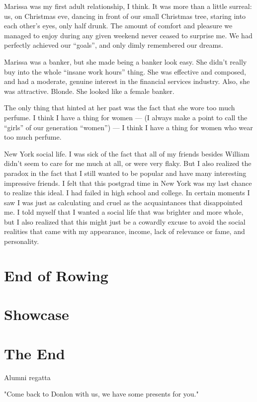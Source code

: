 \documentclass[12pt]{article}
\begin{document}
Marissa was my first adult relationship, I think.  It was more than a little
surreal: us, on Christmas eve, dancing in front of our small Christmas tree,
staring into each other's eyes, only half drunk.  The amount of comfort and
pleasure we managed to enjoy during any given weekend never ceased to surprise
me.  We had perfectly achieved our ``goals'', and only dimly remembered our
dreams.

Marissa was a banker, but she made being a banker look easy.  She didn't really
buy into the whole ``insane work hours'' thing.  She was effective and composed,
and had a moderate, genuine interest in the financial services industry.  Also,
she was attractive.  Blonde.  She looked like a female banker. 

The only thing that hinted at her past was the fact that she wore too much
perfume.  I think I have a thing for women --- (I always make a point to call
the ``girls'' of our generation ``women'') --- I think I have a thing for women
who wear too much perfume.

New York social life.  I was sick of the fact that all of my friends besides
William didn't seem to care for me much at all, or were very flaky.  But I also
realized the paradox in the fact that I still wanted to be popular and have many
interesting impressive friends.  I felt that this postgrad time in New York was
my last chance to realize this ideal.  I had failed in high school and college.
In certain moments I saw I was just as calculating and cruel as the
acquaintances that disappointed me.  I told myself that I wanted a social life
that was brighter and more whole, but I also realized that this might just be a
cowardly excuse to avoid the social realities that came with my appearance,
income, lack of relevance or fame, and personality.


\section{End of Rowing}

\section{Showcase}

\section{The End}
Alumni regatta

"Come back to Donlon with us, we have some presents for you."
\end{document}
